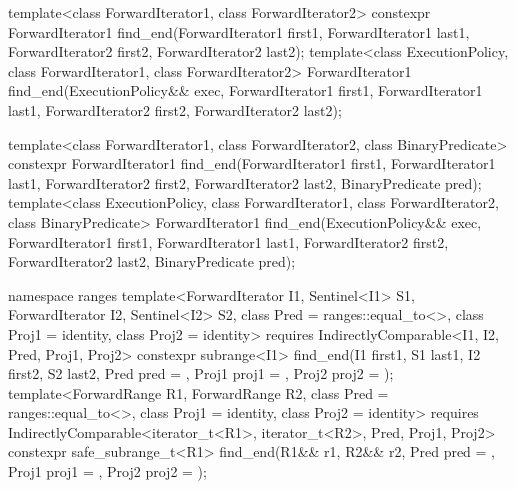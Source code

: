 %
\begin{itemdecl}
template<class ForwardIterator1, class ForwardIterator2>
  constexpr ForwardIterator1
    find_end(ForwardIterator1 first1, ForwardIterator1 last1,
             ForwardIterator2 first2, ForwardIterator2 last2);
template<class ExecutionPolicy, class ForwardIterator1, class ForwardIterator2>
  ForwardIterator1
    find_end(ExecutionPolicy&& exec,
             ForwardIterator1 first1, ForwardIterator1 last1,
             ForwardIterator2 first2, ForwardIterator2 last2);

template<class ForwardIterator1, class ForwardIterator2,
         class BinaryPredicate>
  constexpr ForwardIterator1
    find_end(ForwardIterator1 first1, ForwardIterator1 last1,
             ForwardIterator2 first2, ForwardIterator2 last2,
             BinaryPredicate pred);
template<class ExecutionPolicy, class ForwardIterator1, class ForwardIterator2,
         class BinaryPredicate>
  ForwardIterator1
    find_end(ExecutionPolicy&& exec,
             ForwardIterator1 first1, ForwardIterator1 last1,
             ForwardIterator2 first2, ForwardIterator2 last2,
             BinaryPredicate pred);

namespace ranges {
  template<ForwardIterator I1, Sentinel<I1> S1, ForwardIterator I2, Sentinel<I2> S2,
      class Pred = ranges::equal_to<>, class Proj1 = identity, class Proj2 = identity>
    requires IndirectlyComparable<I1, I2, Pred, Proj1, Proj2>
    constexpr subrange<I1>
      find_end(I1 first1, S1 last1, I2 first2, S2 last2, Pred pred = {},
               Proj1 proj1 = {}, Proj2 proj2 = {});
  template<ForwardRange R1, ForwardRange R2,
      class Pred = ranges::equal_to<>, class Proj1 = identity, class Proj2 = identity>
    requires IndirectlyComparable<iterator_t<R1>, iterator_t<R2>, Pred, Proj1, Proj2>
    constexpr safe_subrange_t<R1>
      find_end(R1&& r1, R2&& r2, Pred pred = {},
               Proj1 proj1 = {}, Proj2 proj2 = {});
}
\end{itemdecl}

